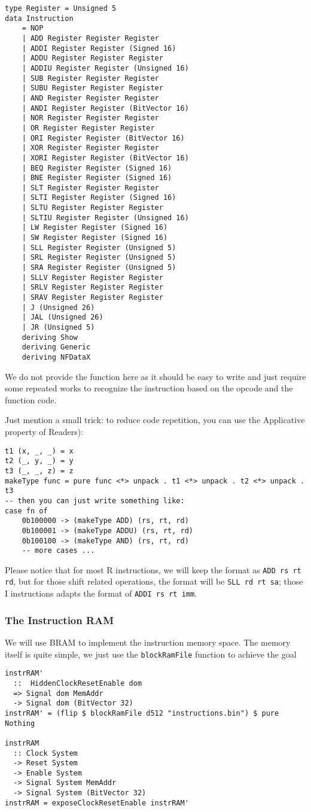 \begin{verbatim}
type Register = Unsigned 5
data Instruction
    = NOP
    | ADD Register Register Register
    | ADDI Register Register (Signed 16)
    | ADDU Register Register Register
    | ADDIU Register Register (Unsigned 16)
    | SUB Register Register Register
    | SUBU Register Register Register
    | AND Register Register Register
    | ANDI Register Register (BitVector 16)
    | NOR Register Register Register
    | OR Register Register Register
    | ORI Register Register (BitVector 16)
    | XOR Register Register Register
    | XORI Register Register (BitVector 16)
    | BEQ Register Register (Signed 16)
    | BNE Register Register (Signed 16)
    | SLT Register Register Register
    | SLTI Register Register (Signed 16)
    | SLTU Register Register Register
    | SLTIU Register Register (Unsigned 16)
    | LW Register Register (Signed 16)
    | SW Register Register (Signed 16)
    | SLL Register Register (Unsigned 5)
    | SRL Register Register (Unsigned 5)
    | SRA Register Register (Unsigned 5)
    | SLLV Register Register Register
    | SRLV Register Register Register
    | SRAV Register Register Register
    | J (Unsigned 26)
    | JAL (Unsigned 26)
    | JR (Unsigned 5)
    deriving Show
    deriving Generic
    deriving NFDataX
\end{verbatim}
We do not provide the function  here as it should be easy to write and just require some repeated works to recognize the instruction based on the opcode and the function code.

Just mention a small trick: to reduce code repetition, you can use the Applicative property of Readers):
\begin{verbatim}
t1 (x, _, _) = x
t2 (_, y, _) = y
t3 (_, _, z) = z
makeType func = pure func <*> unpack . t1 <*> unpack . t2 <*> unpack . t3
-- then you can just write something like:
case fn of
    0b100000 -> (makeType ADD) (rs, rt, rd)
    0b100001 -> (makeType ADDU) (rs, rt, rd)
    0b100100 -> (makeType AND) (rs, rt, rd)
    -- more cases ...
\end{verbatim}
Please notice that for most R instructions, we will keep the format as \texttt{ADD rs rt rd}, but for those shift related operations, the format will be \texttt{SLL rd rt sa}; those I instructions adapts the format of \texttt{ADDI rs rt imm}.
\subsubsection{The Instruction RAM}
We will use BRAM to implement the instruction memory space. The memory itself is quite simple, we just use the  \texttt{blockRamFile} function to achieve the goal
\begin{verbatim}
instrRAM' 
  ::  HiddenClockResetEnable dom
  => Signal dom MemAddr
  -> Signal dom (BitVector 32)
instrRAM' = (flip $ blockRamFile d512 "instructions.bin") $ pure Nothing

instrRAM 
  :: Clock System
  -> Reset System
  -> Enable System
  -> Signal System MemAddr
  -> Signal System (BitVector 32)
instrRAM = exposeClockResetEnable instrRAM'
\end{verbatim}
